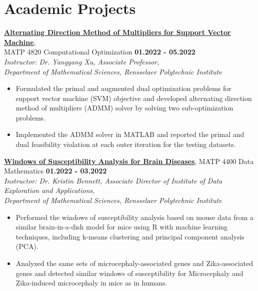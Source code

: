 \documentclass[letterpaper, 10pt]{article}
\newcommand{\subsectionvspace}{\vspace{6pt}}
\begin{document}
\section{Academic Projects}


    \textbf{\href{https://github.com/tianrui-qi/ADMM-for-SVM}{Alternating Direction Method of Multipliers for Support Vector Machine}}, \\
    MATP 4820 Computational Optimization \hfill \textbf{01.2022 - 05.2022} \\
    \textit{
        Instructor: Dr. Yangyang Xu, 
        Associate Professor, \\
        Department of Mathematical Sciences, 
        Rensselaer Polytechnic Institute
    }
    \begin{itemize}
        \item Formulated the primal and augmented dual optimization problems for support vector machine (SVM) objective and developed alternating direction method of multipliers (ADMM) solver by solving two sub-optimization problems.
        \item Implemented the ADMM solver in MATLAB and reported the primal and dual feasibility violation at each outer iteration for the testing datasets.
    \end{itemize}

    \subsectionvspace

    \textbf{\href{https://github.com/tianrui-qi/WOS-Analysis}{Windows of Susceptibility Analysis for Brain Diseases}}, 
    MATP 4400 Data Mathematics \hfill \textbf{01.2022 - 03.2022} \\
    \textit{
        Instructor: Dr. Kristin Bennett, 
        Associate Director of Institute of Data Exploration and Applications, \\
        Department of Mathematical Sciences, 
        Rensselaer Polytechnic Institute
    }
    \begin{itemize}
        \item Performed the windows of susceptibility analysis based on mouse data from a similar brain-in-a-dish model for mice using R with machine learning techniques, including k-means clustering and principal component analysis (PCA).
        \item Analyzed the same sets of microcephaly-associated genes and Zika-associated genes and detected similar windows of susceptibility for Microcephaly and Zika-induced microcephaly in mice as in humans.
    \end{itemize}
\end{document}
